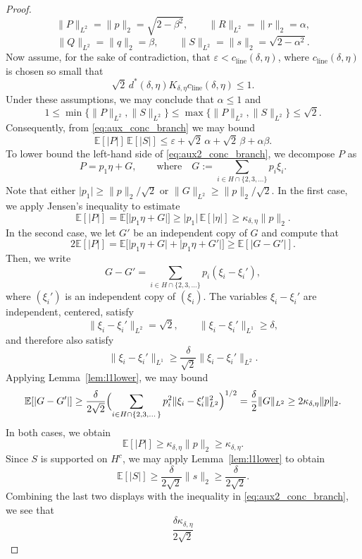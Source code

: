 \documentclass[11pt]{amsart}
\numberwithin{equation}{section}
\theoremstyle{definition}
\theoremstyle{remark}
\newcommand{\E}{\mathbb E}
\newcommand{\eps}{\varepsilon}
\newcommand{\abs}[1]{\lvert #1 \rvert}
\newcommand{\norm}[1]{\lVert #1 \rVert}
\begin{document}
\begin{proof}
	\[
	\norm{P}_{L^2}=\norm{p}_2=\sqrt{2-\beta^2},
	\qquad
	\norm{R}_{L^2}=\norm{r}_2=\alpha,
	\]
	\[
	\norm{Q}_{L^2}=\norm{q}_2=\beta,
	\qquad
	\norm{S}_{L^2}=\norm{s}_2=\sqrt{2-\alpha^2}.
	\]
	Now assume, for the sake of contradiction, that $\eps<c_{\mathrm{line}}(\delta,\eta)$, where
	$c_{\mathrm{line}}(\delta,\eta)$ is chosen so small that
	\[
	\sqrt2\,d^*(\delta,\eta)K_{\delta,\eta}c_{\mathrm{line}}(\delta,\eta)\le1.
	\]
	Under these assumptions, we may conclude that $\alpha\le1$ and
	\[
    1\le \min\{\|P\|_{L^2},\|S\|_{L^2}\}\le \max\{\|P\|_{L^2},\|S\|_{L^2}\} 
	\le \sqrt{2}.
	\]
	Consequently, from \eqref{eq:aux_conc_branch} we may bound
	\begin{equation}
    \label{eq:aux2_conc_branch}
	\E[\abs{P}]\,\E[\abs{S}]
	\le
	\eps+\sqrt2\,\alpha+\sqrt2\,\beta+\alpha\beta.
	\end{equation}
	To lower bound the left-hand side of \eqref{eq:aux2_conc_branch}, we decompose $P$ as 
	\[
	P=p_1\eta+G,
	\qquad \text{where} \quad 
	G:=\sum_{i\in H\cap\{2,3,\dots\}} p_i\xi_i.
	\]
	Note that either $\abs{p_1}\ge \norm{p}_2/\sqrt2$ or $\norm{G}_{L^2}\ge \norm{p}_2/\sqrt2$.
	In the first case, we apply Jensen's inequality to estimate
	\[
	\E[\abs{P}]
	=\E\bigl[\abs{p_1\eta+G}\bigr]
	\ge
	\abs{p_1}\,\E[\abs{\eta}]
	\ge
	\kappa_{\delta,\eta}\norm{p}_2.
	\]
	In the second case, we let $G'$ be an independent copy of $G$ and compute that
	\[
	2\E[\abs{P}]
	=\E\bigl[\abs{p_1\eta+G}+\abs{p_1\eta+G'}\bigr]
	\ge \E[\abs{G-G'}].
	\]
	Then, we write
	\[
	G-G'
	=
	\sum_{i\in H\cap\{2,3,\dots\}} p_i(\xi_i-\xi_i'),
	\]
	where $(\xi_i')$ is an independent copy of $(\xi_i)$.  The variables
	$\xi_i-\xi_i'$ are independent, centered, satisfy
	\[
	\norm{\xi_i-\xi_i'}_{L^2}=\sqrt2,
	\qquad
	\norm{\xi_i-\xi_i'}_{L^1}\ge \delta,
	\]
	and therefore also satisfy
	\[
	\norm{\xi_i-\xi_i'}_{L^1}
	\ge \frac{\delta}{\sqrt2}\norm{\xi_i-\xi_i'}_{L^2}.
	\]
	Applying Lemma~\ref{lem:l1lower}, we may bound
	\[
	\E[\abs{G-G'}]
	\ge
	\frac{\delta}{2\sqrt2}
	\Bigl(\sum_{i\in H\cap\{2,3,\dots\}} p_i^2
	\norm{\xi_i-\xi_i'}_{L^2}^2\Bigr)^{1/2}
	=\frac{\delta}{2}\norm{G}_{L^2}
	\ge 2\kappa_{\delta,\eta}\norm{p}_2.
	\]
	In both cases, we obtain
	\[
	\E[\abs{P}]
	\ge \kappa_{\delta,\eta}\norm{p}_2
	\ge \kappa_{\delta,\eta}.
	\]
	Since $S$ is supported on $H^c$, we may apply
	Lemma~\ref{lem:l1lower} to obtain
	\[
	\E[\abs{S}]
	\ge \frac{\delta}{2\sqrt2}\norm{s}_2
	\ge \frac{\delta}{2\sqrt2}.
	\]
	Combining the last two displays with the inequality in \eqref{eq:aux2_conc_branch}, we see that
	\[
	\frac{\delta\kappa_{\delta,\eta}}{2\sqrt2}
\]
\end{proof}
\end{document}
